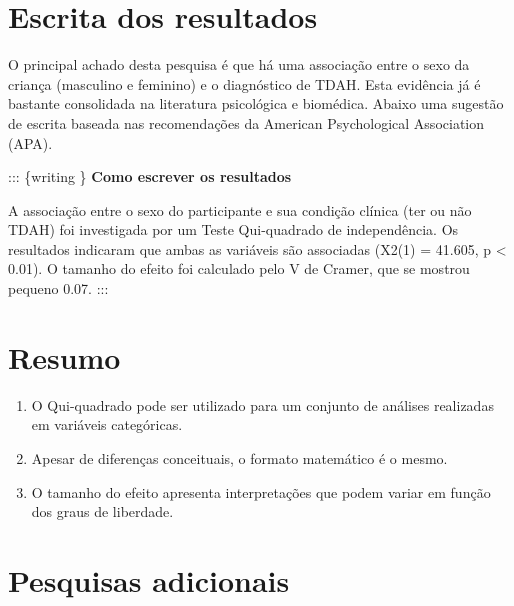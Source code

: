 \documentclass[
]{book}
\providecommand{\tightlist}{%
  \setlength{\itemsep}{0pt}\setlength{\parskip}{0pt}}
\newenvironment{explore}{
  \definecolor{shadecolor}{rgb}{0, 0, 0}  %
  \color{white}
  \begin{shaded}}
 {\end{shaded}}
\begin{document}
\hypertarget{escrita-dos-resultados}{%
\section{Escrita dos resultados}\label{escrita-dos-resultados}}

O principal achado desta pesquisa é que há uma associação entre o sexo da criança (masculino e feminino) e o diagnóstico de TDAH. Esta evidência já é bastante consolidada na literatura psicológica e biomédica. Abaixo uma sugestão de escrita baseada nas recomendações da American Psychological Association (APA).

::: \{writing \}
\textbf{Como escrever os resultados}

A associação entre o sexo do participante e sua condição clínica (ter ou não TDAH) foi investigada por um Teste Qui-quadrado de independência. Os resultados indicaram que ambas as variáveis são associadas (X2(1) = 41.605, p \textless{} 0.01). O tamanho do efeito foi calculado pelo V de Cramer, que se mostrou pequeno 0.07.
:::

\hypertarget{resumo-6}{%
\section{Resumo}\label{resumo-6}}

\begin{explore}

\begin{enumerate}
\def\labelenumi{\arabic{enumi}.}
\tightlist
\item
  O Qui-quadrado pode ser utilizado para um conjunto de análises realizadas em variáveis categóricas.\\
\item
  Apesar de diferenças conceituais, o formato matemático é o mesmo.\\
\item
  O tamanho do efeito apresenta interpretações que podem variar em função dos graus de liberdade.\\
\end{enumerate}

\end{explore}

\hypertarget{pesquisas-adicionais-1}{%
\section{Pesquisas adicionais}\label{pesquisas-adicionais-1}}
\end{document}

